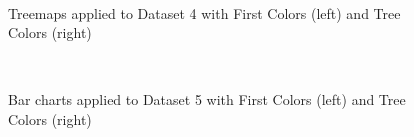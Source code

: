 \documentclass[journal]{vgtc}                %
\begin{document}
\begin{figure}[tb]
  \centering
  \mbox{
  }
  \caption{Treemaps applied to Dataset 4 with First Colors (left) and Tree Colors (right)}\label{fig:treemapSvy}

\end{figure}



\begin{figure}[tb]
  \centering
  \mbox{
  }
  \caption{Bar charts applied to Dataset 5 with First Colors (left) and Tree Colors (right)}\label{fig:barSvy}

\end{figure}
\end{document}
